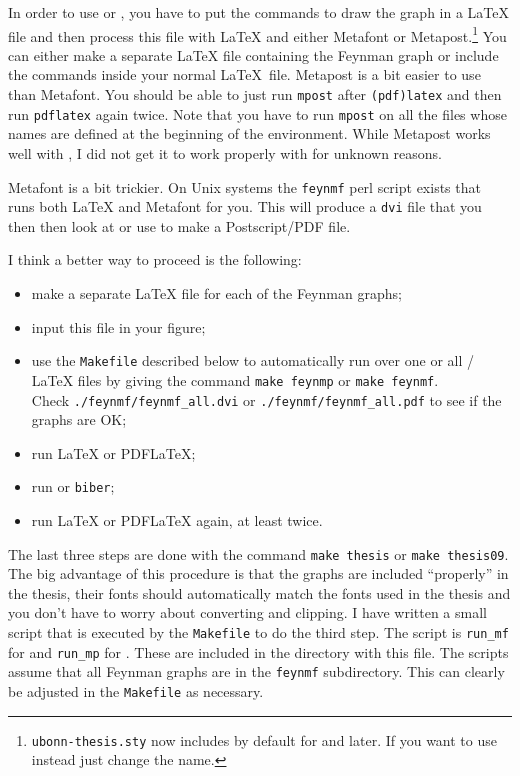 In order to use  or , you have to put
the commands to draw the graph in a \LaTeX{} file and then process
this file with \LaTeX{} and either Metafont or
Metapost.\footnote{\texttt{ubonn-thesis.sty} now includes 
  by default for  and later. If you want to use
   instead just change the name.}  You can either make
a separate \LaTeX{} file containing the Feynman graph or include the
commands inside your normal \LaTeX\ file.  Metapost is
a bit easier to use than Metafont.  You should be able to just run
\texttt{mpost} after \texttt{(pdf)latex} and then run
\texttt{pdflatex} again twice. Note that you have to run
\texttt{mpost} on all the files whose names are defined at the
beginning of the  environment. While Metapost works well
with , I did not get it to work properly with  for unknown reasons.

Metafont is a bit trickier. On Unix systems the
\texttt{feynmf} perl script exists that runs both \LaTeX{} and
Metafont for you. This will produce a \texttt{dvi} file that you then
then look at or use to make a Postscript/PDF file.

I think a better way to proceed is the following:
\begin{itemize}
\item make a separate \LaTeX{} file for each of the Feynman graphs;
\item input this file in your figure;
\item use the \texttt{Makefile} described below to automatically run
  over one or all / \LaTeX{} files by giving the
  command \texttt{make feynmp} or \texttt{make feynmf}.\\
  Check
  \texttt{./feynmf/feynmf\_all.dvi} or
  \texttt{./feynmf/feynmf\_all.pdf} to see if the graphs are OK;
\item run \LaTeX{} or PDF\LaTeX;
\item run \BibTeX{} or \texttt{biber};
\item run \LaTeX{} or PDF\LaTeX{} again, at least twice.
\end{itemize}
The last three steps are done with the command \texttt{make thesis} or
\texttt{make thesis09}.
The big advantage of this procedure is that the graphs are included
\enquote{properly} in the thesis, their fonts should automatically
match the fonts used in the thesis and you don't have to worry about
converting and clipping. I have written a small script that is
executed by the \texttt{Makefile} to do the third step.
The script is \texttt{run\_mf} for  and
\texttt{run\_mp} for . These are
included in the directory with this file.
The scripts assume that all Feynman
graphs are in the \texttt{feynmf} subdirectory. This can clearly be
adjusted in the \texttt{Makefile} as necessary.

